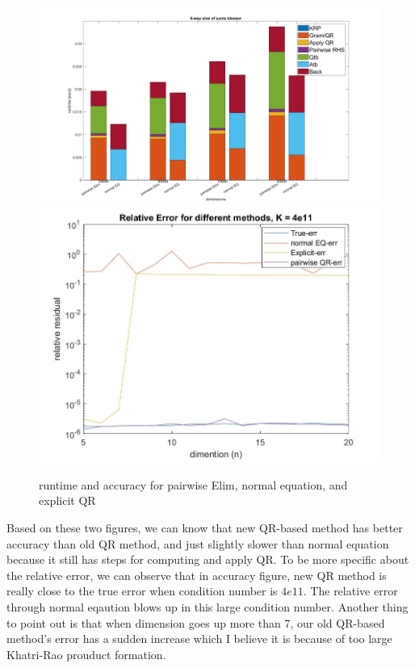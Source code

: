 \documentclass{article}
\begin{document}
\begin{figure}[ht!]
  
  \begin{center}
    \includegraphics*[scale = 0.12]{6stacked.jpg}
    \includegraphics*[scale = 0.22]{6wayacc.jpg}
    \caption[Figure]{runtime and accuracy for pairwise Elim, normal equation, and explicit QR \label{fig:LS_problem}}
  \end{center}
  
  
\end{figure}


Based on these two figures, we can know that new QR-based method has better accuracy than old QR method, and just slightly slower than 
normal equation because it still has steps for computing and apply QR. To be more specific about the relative error, we can observe
that in accuracy figure, new QR method is really close to the true error when condition number is $4e11$. The relative error through normal eqaution
blows up in this large condition number.
Another thing to point out is that when dimension goes up more than 7, our old QR-based method's error has a sudden increase which I believe 
it is because of too large Khatri-Rao prouduct formation.
\end{document}
